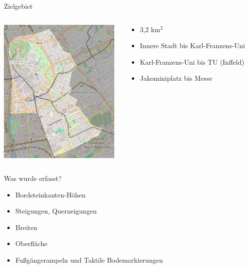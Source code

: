 \documentclass{beamer}
\begin{document}
\begin{frame}{Zielgebiet}

  \begin{columns}[c]
    \begin{column}[T]{.6\textwidth}
      \begin{center}
      \vspace{-1cm}
      \includegraphics[width=6cm]{gebiet.png}
      \end{center}
    \end{column}
    \begin{column}[T]{.4\textwidth}
      \begin{itemize}
            \item 3,2 km$^2$
            \item Innere Stadt bis Karl-Franzens-Uni
    \item       Karl-Franzens-Uni bis TU (Inffeld)
  \item       Jakominiplatz bis Messe
    \end{itemize}
    \end{column}
  \end{columns}

\end{frame}

\begin{frame}{Was wurde erfasst?}

    \begin{itemize}
      \item Bordsteinkanten-Höhen
      \item Steigungen, Querneigungen
      \item Breiten
      \item Oberfläche
      \item Fußgängerampeln und Taktile Bodemarkierungen
    \end{itemize}


\end{frame}
\end{document}
